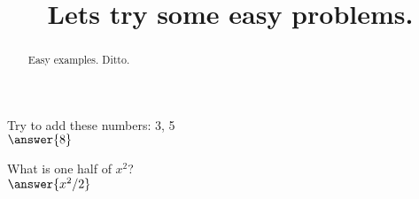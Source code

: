 \documentclass{ximera}
\title{Lets try some easy problems.}
\begin{document}
	\begin{abstract}
		Easy examples. Ditto.
	\end{abstract}
	\maketitle
	
	
\begin{question}
	Try to add these numbers: 3, 5\\
	$\answer{8}$
\end{question}
	
	\begin{question}
		What is one half of $x^2$?\\
		$	\answer{x^2/2}$
	\end{question}
	
\end{document}
